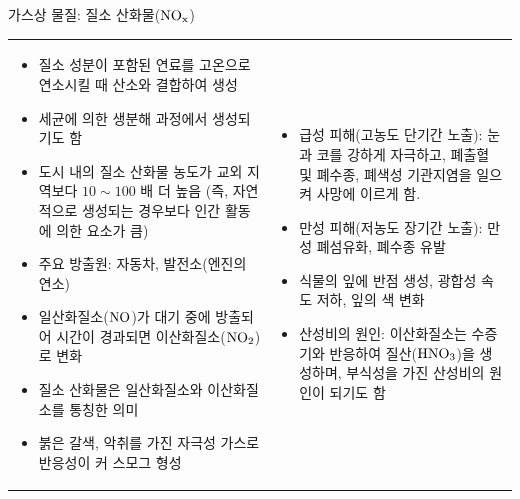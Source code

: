 \begin{frame}[t]{가스상 물질: 질소 산화물($\rm{{NO}_{x}}$)}
	\begin{tabular}{ll}
		\begin{minipage}[t]{0.475\textwidth}\scriptsize
			\begin{itemize}
				\item 질소 성분이 포함된 연료를 고온으로 연소시킬 때 산소와 결합하여 생성
				\item 세균에 의한 생분해 과정에서 생성되기도 함
				\item 도시 내의 질소 산화물 농도가 교외 지역보다 $10 \sim 100$ 배 더 높음 
				(즉, 자연적으로 생성되는 경우보다 인간 활동에 의한 요소가 큼)
				\item 주요 방출원: 자동차, 발전소(엔진의 연소)
				\item 일산화질소($\rm{NO}$)가 대기 중에 방출되어 시간이 경과되면 이산화질소($\rm{{NO}_{2}}$)로 변화
				\item 질소 산화물은 일산화질소와 이산화질소를 통칭한 의미
				\item 붉은 갈색, 악취를 가진 자극성 가스로 반응성이 커 스모그 형성
			\end{itemize}
		\end{minipage}	
		&
		\begin{minipage}[t]{0.475\textwidth} \scriptsize	
			\begin{itemize}
				\item 급성 피해(고농도 단기간 노출): 눈과 코를 강하게 자극하고, 폐출혈 및 폐수종, 폐색성 기관지염을 일으켜 사망에 이르게 함.
				\item 만성 피해(저농도 장기간 노출): 만성 폐섬유화, 폐수종 유발
				\item 식물의 잎에 반점 생성, 광합성 속도 저하, 잎의 색 변화
				\item 산성비의 원인: 이산화질소는 수증기와 반응하여 질산($\rm{{HNO}_{3}}$)을 생성하며, 부식성을 가진 산성비의 원인이 되기도 함
			\end{itemize}
		\end{minipage}
	\end{tabular}
\end{frame}




